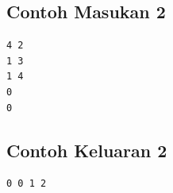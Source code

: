\documentclass{article}
\begin{document}
\begin{multicols}{2}
\subsection*{Contoh Masukan 2}
\begin{lstlisting}
4 2
1 3
1 4
0
0
\end{lstlisting}
\columnbreak
\subsection*{Contoh Keluaran 2}
\begin{lstlisting}
0 0 1 2
\end{lstlisting}
\vfill
\null
\end{multicols}


\pagebreak
\end{document}
